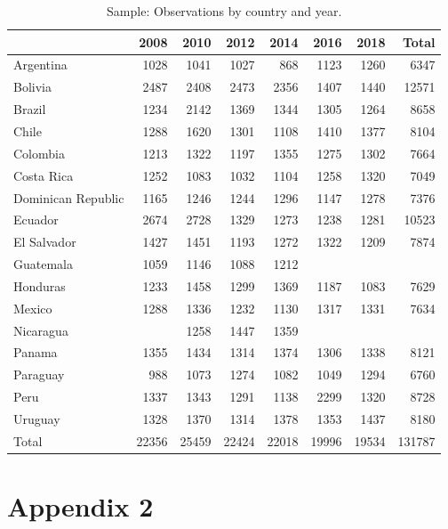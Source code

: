 \documentclass[utf8]{frontiersSCNS} %
\begin{document}
\begin{table}[h]
\centering
	\caption{Sample: Observations by country and year.}
	\label{appendix1}
	\renewcommand{\arraystretch}{0.8}
    \begin{tabular}{lrrrrrrr}
     \toprule
     & 2008 & 2010 & 2012 & 2014 & 2016 & 2018 & Total \\
		\midrule
		Argentina & 1028 & 1041 & 1027 & 868 & 1123 & 1260 & 6347 \\
		Bolivia & 2487 & 2408 & 2473 & 2356 & 1407 & 1440 & 12571 \\
		Brazil & 1234 & 2142 & 1369 & 1344 & 1305 & 1264 & 8658 \\
		Chile & 1288 & 1620 & 1301 & 1108 & 1410 & 1377 & 8104 \\
		Colombia & 1213 & 1322 & 1197 & 1355 & 1275 & 1302 & 7664 \\
		Costa Rica & 1252 & 1083 & 1032 & 1104 & 1258 & 1320 & 7049 \\
		Dominican Republic & 1165 & 1246 & 1244 & 1296 & 1147 & 1278 & 7376 \\
		Ecuador & 2674 & 2728 & 1329 & 1273 & 1238 & 1281 & 10523 \\
		El Salvador & 1427 & 1451 & 1193 & 1272 & 1322 & 1209 & 7874 \\
		Guatemala & 1059 & 1146 & 1088 & 1212 &  &  &  \\
		Honduras & 1233 & 1458 & 1299 & 1369 & 1187 & 1083 & 7629 \\
		Mexico & 1288 & 1336 & 1232 & 1130 & 1317 & 1331 & 7634 \\
		Nicaragua &  & 1258 & 1447 & 1359 &  &  &  \\
		Panama & 1355 & 1434 & 1314 & 1374 & 1306 & 1338 & 8121 \\
		Paraguay & 988 & 1073 & 1274 & 1082 & 1049 & 1294 & 6760 \\
		Peru & 1337 & 1343 & 1291 & 1138 & 2299 & 1320 & 8728 \\
		Uruguay & 1328 & 1370 & 1314 & 1378 & 1353 & 1437 & 8180 \\
		Total & 22356 & 25459 & 22424 & 22018 & 19996 & 19534 & 131787 \\
		\bottomrule
	\end{tabular}
\end{table}

\newpage

\section{Appendix 2}
\end{document}
